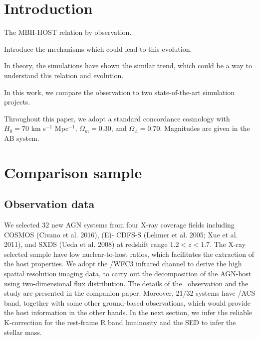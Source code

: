 \documentclass[twocolumn]{aastex62}
\begin{document}

\section{Introduction} \label{sec_intro}
The MBH-HOST relation by observation.

Introduce the mechanisms which could lead to this evolution.

In theory, the simulations have shown the similar trend, which could be a way to understand this relation and evolution.

In this work, we compare the observation to two state-of-the-art simulation projects. 


Throughout this paper, we adopt a standard concordance cosmology with $H_0= 70$ km s$^{-1}$ Mpc$^{-1}$, $\Omega{_m} = 0.30$, and $\Omega{_\Lambda} =
0.70$. Magnitudes are given in the AB system.


\section{Comparison sample} \label{data}

\subsection{Observation data} 
We selected 32 new AGN systems from four X-ray coverage fields including COSMOS (Civano et al. 2016), (E)- CDFS-S (Lehmer et al. 2005; Xue et al. 2011), and SXDS (Ueda et al. 2008) at redshift range $1.2<z<1.7$. The X-ray selected sample have low nuclear-to-host ratios, which facilitates the extraction of the host properties. We adopt the \hst/WFC3 infrared channel to derive the high spatial resolution imaging data, to carry out the decomposition of the AGN-host using two-dimensional flux distribution. The details of the \hst\ observation and the study are presented in the companion paper. Moreover, 21/32 systems have \hst/ACS band, together with some other ground-based observations, which would provide the host information in the other bands. In the next section, we infer the reliable K-correction for the rest-frame R band luminosity and the SED to infer the stellar mass.
\end{document}
